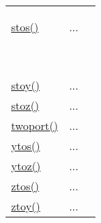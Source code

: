 \textcolor{blue}{}\begin{tabular}{>{\raggedleft}b{3cm}>{\centering}b{0.5cm}>{\raggedright}b{12cm}}
\textcolor{blue}{\hyperlink{stos}{stos()}}

\textcolor{blue}{~}&
...

\textcolor{blue}{~}&
 \begin{NoHyper} \nameref{par:stos} \end{NoHyper}\tabularnewline
\textcolor{blue}{\hyperlink{stoy}{stoy()}}&
...&
 \begin{NoHyper} \nameref{par:stoy} \end{NoHyper}\tabularnewline
\textcolor{blue}{\hyperlink{stoz}{stoz()}}&
...&
 \begin{NoHyper} \nameref{par:stoz} \end{NoHyper}\tabularnewline
\textcolor{blue}{\hyperlink{twoport}{twoport()}}&
...&
 \begin{NoHyper} \nameref{par:twoport} \end{NoHyper}\tabularnewline
\textcolor{blue}{\hyperlink{ytos}{ytos()}}&
...&
 \begin{NoHyper} \nameref{par:ytos} \end{NoHyper}\tabularnewline
\textcolor{blue}{\hyperlink{ytoz}{ytoz()}}&
...&
 \begin{NoHyper} \nameref{par:ytoz} \end{NoHyper}\tabularnewline
\textcolor{blue}{\hyperlink{ztos}{ztos()}}&
...&
 \begin{NoHyper} \nameref{par:ztos} \end{NoHyper}\tabularnewline
\textcolor{blue}{\hyperlink{ztoy}{ztoy()}}&
...&
 \begin{NoHyper} \nameref{par:ztoy} \end{NoHyper}\tabularnewline
\end{tabular}


\subsubsection*{}

